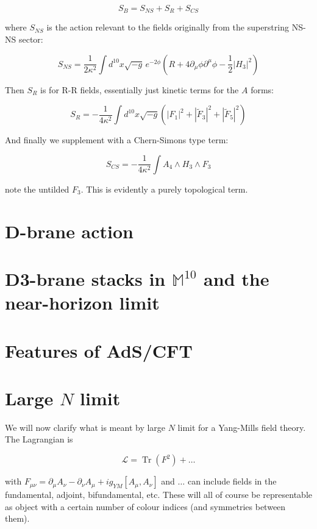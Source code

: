 \documentclass[11pt,a4paper,twoside,openright]{book}
\DeclareMathOperator{\Tr}{Tr}
\begin{document}
\[ S_B = S_{NS} + S_R + S_{CS} \]

where $S_{NS}$ is the action relevant to the fields originally from the superstring NS-NS sector:

\[ S_{NS} = \frac{1}{2\kappa^2} \int d^{10} x \sqrt{-g} \, e^{-2\phi} \left( R + 4 \partial_\mu \phi \partial^\mu \phi - \frac{1}{2} | H_3 |^2 \right) \]

Then $S_R$ is for R-R fields, essentially just kinetic terms for the $A$ forms:

\[ S_R = -\frac{1}{4\kappa^2} \int d^{10} x \sqrt{-g} 
\left(| F_1 |^2 + | \tilde{F}_3 |^2 + | \tilde{F}_5 |^2 \right)\]

And finally we supplement with a Chern-Simons type term:

\[ S_{CS} = -\frac{1}{4\kappa^2} \int A_4 \wedge H_3 \wedge F_3 \]

note the untilded $F_3$. This is evidently a purely topological term.

\cite{kw_SB}

\section{D-brane action}

\section{D3-brane stacks in $\mathbb{M}^{10}$ and the near-horizon limit}

\section{Features of AdS/CFT}

\section{Large $N$ limit}

We will now clarify what is meant by large $N$ limit for a Yang-Mills field theory.\\

The Lagrangian is

\[\mathcal{L} = \Tr \left(F^2\right) + \ldots \]

with $F_{\mu\nu} = \partial_\mu A_\nu - \partial_\nu A_\mu + i g_{YM} [A_\mu,A_\nu]$ and $\ldots$ can include fields in the fundamental, adjoint, bifundamental, etc. These will all of course be representable as object with a certain number of colour indices (and symmetries between them).\\
\end{document}
